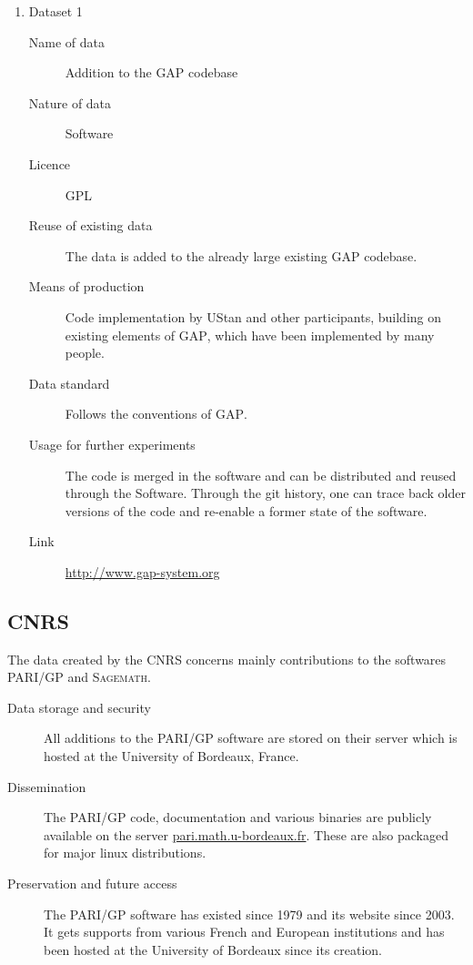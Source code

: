 \documentclass[12pt]{article}
\newcommand{\software}[1]{\textsc{#1}\xspace}
\newcommand{\Sage}{\software{Sagemath}}
\newcommand{\GAP}{\software{GAP}}
\newcommand{\PARIGP}{\software{PARI/GP}}
\begin{document}
\begin{enumerate}





\item {Dataset 1}


\begin{description}
\item[Name of data] Addition to the \GAP codebase
\item[Nature of data] Software
\item[Licence] GPL
\item[Reuse of existing data] The data is added to the already large existing \GAP codebase.
\item[Means of production] Code implementation by UStan and other
  participants, building on existing elements of \GAP, which have been
  implemented by many people.
\item[Data standard] Follows the conventions of \GAP.
\item [Usage for further experiments] The code is merged in the software and can be distributed and reused through the Software. Through the git history,
one can trace back older versions of the code and re-enable a former state of the software.
\item [Link] \href{http://www.gap-system.org}{http://www.gap-system.org}
\end{description}

%
%
\end{enumerate}

\subsection{CNRS}

The data created by the CNRS concerns mainly contributions to the softwares \PARIGP and \Sage.
\begin{description}
\item[Data storage and security] All additions to the \PARIGP software are stored on their server which is hosted at the University of Bordeaux, France.
\item[Dissemination] The \PARIGP code, documentation and various binaries are publicly available on the server \href{http://pari.math.u-bordeaux.fr/}{pari.math.u-bordeaux.fr}. These are also packaged for major linux distributions.
\item[Preservation and future access] The \PARIGP software has existed
  since 1979 and its website since 2003. It gets supports from various
  French and European institutions and has been hosted at the University of Bordeaux since its creation.
\end{description}
\end{document}
